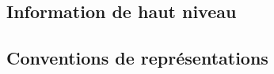 \subsection{Information de haut niveau}

\subsection{Conventions de représentations}
\label{subsec:convention_representation}

